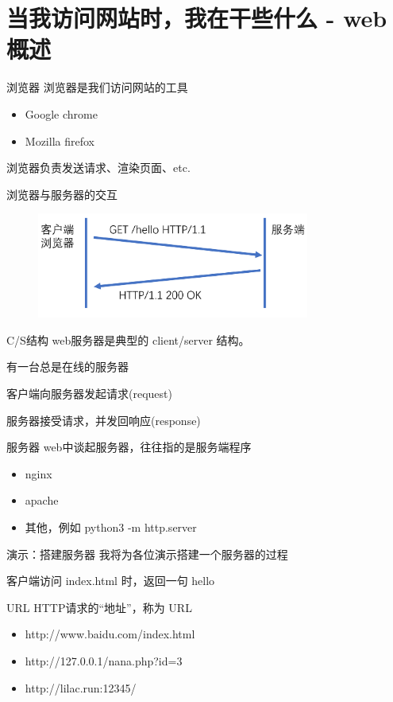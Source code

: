 \documentclass[UTF8]{ctexbeamer}
\begin{document}
\section{当我访问网站时，我在干些什么 - web概述}
\begin{frame}{浏览器}
    浏览器是我们访问网站的工具
    \begin{itemize}
        \item Google chrome
        \item Mozilla firefox
    \end{itemize}
    浏览器负责发送请求、渲染页面、etc.
\end{frame}
\begin{frame}{浏览器与服务器的交互}
    \begin{figure}
        \centering
        \includegraphics[width=0.8\textwidth]{http.png}
    \end{figure}
\end{frame}
\begin{frame}{C/S结构}
    web服务器是典型的 client/server 结构。
    
    有一台总是在线的服务器
    
    客户端向服务器发起请求(request)
    
    服务器接受请求，并发回响应(response)
\end{frame}
\begin{frame}{服务器}
    web中谈起服务器，往往指的是服务端程序
    \begin{itemize}
        \item nginx
        \item apache
        \item 其他，例如 python3 -m http.server
    \end{itemize}
\end{frame}
\begin{frame}{演示：搭建服务器}
    我将为各位演示搭建一个服务器的过程

    客户端访问 index.html 时，返回一句 hello

\end{frame}
\begin{frame}{URL}
    HTTP请求的“地址”，称为 URL
    \begin{itemize}
        \item http://www.baidu.com/index.html
        \item http://127.0.0.1/nana.php?id=3
        \item http://lilac.run:12345/
    \end{itemize}
\end{frame}
\end{document}
